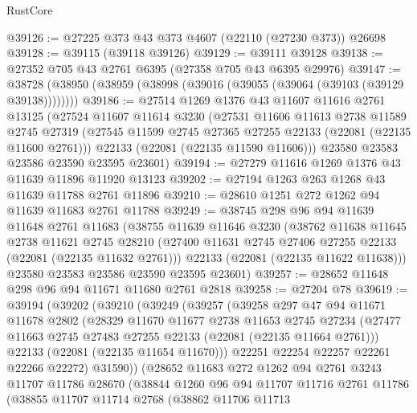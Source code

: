 \begin{lexlean}{RustCore}
\begin{coremodule}
@39126 := @27225 @373 @43 @373 @4607 (@22110 (@27230 @373)) @26698
@39128 := @39115 (@39118 @39126)
@39129 := @39111 @39128
@39138 := @27352 @705 @43 @2761 @6395 (@27358 @705 @43 @6395 @29976)
@39147 := @38728 (@38950 (@38959 (@38998 (@39016 (@39055 (@39064 (@39103 (@39129 @39138))))))))
@39186 := @27514
    @1269
    @1376
    @43
    @11607
    @11616
    @2761
    @13125
    (@27524
      @11607
      @11614
      @3230
      (@27531
        @11606
        @11613
        @2738
        @11589
        @2745
        @27319
        (@27545 @11599 @2745 @27365 @27255 @22133 (@22081 (@22135 @11600 @2761)))
        @22133
        (@22081 (@22135 @11590 @11606)))
      @23580
      @23583
      @23586
      @23590
      @23595
      @23601)
@39194 := @27279 @11616 @1269 @1376 @43 @11639 @11896 @11920 @13123
@39202 := @27194 @1263 @263 @1268 @43 @11639 @11788 @2761 @11896
@39210 := @28610 @1251 @272 @1262 @94 @11639 @11683 @2761 @11788
@39249 := @38745
    @298
    @96
    @94
    @11639
    @11648
    @2761
    @11683
    (@38755
      @11639
      @11646
      @3230
      (@38762
        @11638
        @11645
        @2738
        @11621
        @2745
        @28210
        (@27400 @11631 @2745 @27406 @27255 @22133 (@22081 (@22135 @11632 @2761)))
        @22133
        (@22081 (@22135 @11622 @11638)))
      @23580
      @23583
      @23586
      @23590
      @23595
      @23601)
@39257 := @28652 @11648 @298 @96 @94 @11671 @11680 @2761 @2818
@39258 := @27204 @78
@39619 := @39194
    (@39202
      (@39210
        (@39249
          (@39257
            (@39258
              @297
              @47
              @94
              @11671
              @11678
              @2802
              (@28329
                @11670
                @11677
                @2738
                @11653
                @2745
                @27234
                (@27477 @11663 @2745 @27483 @27255 @22133 (@22081 (@22135 @11664 @2761)))
                @22133
                (@22081 (@22135 @11654 @11670)))
              @22251
              @22254
              @22257
              @22261
              @22266
              @22272)
            @31590))
        (@28652
          @11683
          @272
          @1262
          @94
          @2761
          @3243
          @11707
          @11786
          @28670
          (@38844
            @1260
            @96
            @94
            @11707
            @11716
            @2761
            @11786
            (@38855
              @11707
              @11714
              @2768
              (@38862
                @11706
                @11713

\end{coremodule}
\end{lexlean}
